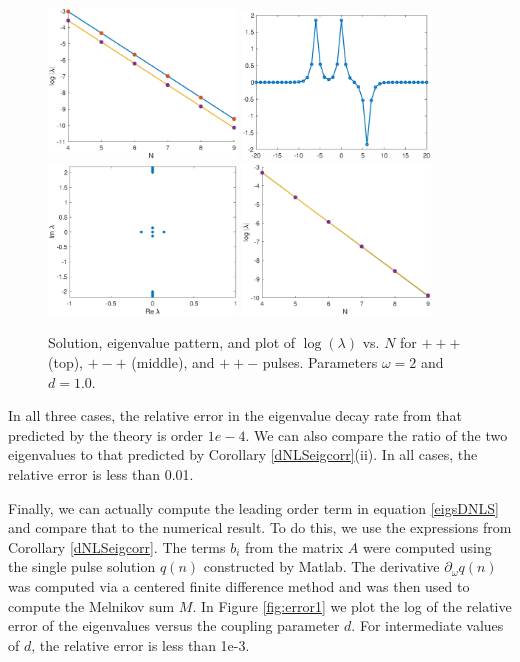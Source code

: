 \documentclass[12pt]{article}
\begin{document}
\begin{figure}[H]
\includegraphics[width=5cm]{dnlsPMPdecay.eps}
\includegraphics[width=5cm]{dnlsPPM.eps}
\includegraphics[width=5cm]{dnlsPPMeig.eps}
\includegraphics[width=5cm]{dnlsPPMdecay.eps}
\caption{Solution, eigenvalue pattern, and plot of $\log(\lambda)$ vs. $N$ for $+++$ (top), $+-+$ (middle), and $++-$ pulses. Parameters $\omega = 2$ and $d = 1.0$.}
\label{fig:eigendecay2}
\end{figure}
In all three cases, the relative error in the eigenvalue decay rate from that predicted by the theory is order $1e-4$. We can also compare the ratio of the two eigenvalues to that predicted by Corollary \eqref{dNLSeigcorr}(ii). In all cases, the relative error is less than 0.01.

Finally, we can actually compute the leading order term in equation \eqref{eigsDNLS} and compare that to the numerical result. To do this, we use the expressions from Corollary \eqref{dNLSeigcorr}. The terms $b_i$ from the matrix $A$ were computed using the single pulse solution $q(n)$ constructed by Matlab. The derivative $\partial_\omega q(n)$ was computed via a centered finite difference method and was then used to compute the Melnikov sum $M$. In Figure \ref{fig:error1} we plot the log of the relative error of the eigenvalues versus the coupling parameter $d$. For intermediate values of $d$, the relative error is less than 1e-3.
\end{document}

